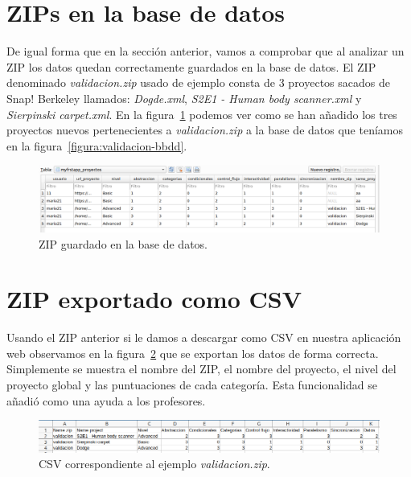 \documentclass[a4paper, 12pt]{book}
\begin{document}
\section{ZIPs en la base de datos}
De igual forma que en la sección anterior, vamos a comprobar que al analizar un ZIP los datos quedan correctamente guardados en la base de datos. El ZIP denominado \textit{validacion.zip} usado de ejemplo  consta de 3 proyectos sacados de Snap! Berkeley llamados: \textit{Dogde.xml}, \textit{ S2E1 - Human body scanner.xml} y \textit{Sierpinski carpet.xml}. En la figura~\ref{figura:bbdd-zip} podemos ver como se han añadido los tres proyectos nuevos pertenecientes a \textit{validacion.zip} a la base de datos que teníamos en la figura~\ref{figura:validacion-bbdd}.
\begin{figure}[h]
            \centering
            \includegraphics[scale=0.37]{img/bbdd-zip.png}
            \caption{ZIP guardado en la base de datos.}
             \label{figura:bbdd-zip}
        \end{figure}
\section{ZIP exportado como CSV}
Usando el ZIP anterior si le damos a descargar como CSV en nuestra aplicación web observamos en la figura~\ref{figura:csv} que se exportan los datos de forma correcta. Simplemente se muestra el nombre del ZIP, el nombre del proyecto, el nivel del proyecto global y las puntuaciones de cada categoría. Esta funcionalidad se añadió como una ayuda a los profesores.
\begin{figure}[h]
            \centering
           \includegraphics[scale=0.5]{img/csv.png}
            \caption{CSV correspondiente al ejemplo \textit{validacion.zip}.}
             \label{figura:csv}
        \end{figure}
\end{document}
